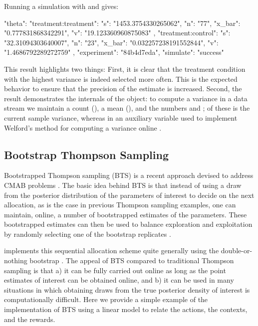 \documentclass[nojss]{jss}
\begin{document}
Running a simulation with  and  gives:

\begin{Code}
{
    "theta": {
        "treatment:treatment": {
            "s": "1453.3754330265062",
            "n": "77",
            "x_bar": "0.777831868342291",
            "v": "19.123360960875083"
        },
        "treatment:control": {
            "s": "32.31094303640007",
            "n": "23",
            "x_bar": "0.032257238191552844",
            "v": "1.4686792289272759"
        }
    },
    "experiment": "84b4d7eda",
    "simulate": "success"
}
\end{Code}
This result highlights two things: First, it is clear that the treatment condition with the highest variance is indeed selected more often. This is the expected behavior to ensure that the precision of the estimate is increased. Second, the result demonstrates the internals of the  object: to compute a variance in a data stream we maintain a count (), a mean (), and the numbers  and ; of these  is the current sample variance, whereas  in an auxiliary variable used to implement Welford's method for computing a variance online \citep{welford1962note}.


\subsection{Bootstrap Thompson Sampling}

Bootstrapped Thompson sampling (BTS) is a recent approach devised to address CMAB problems \citep[see,  e.g.,][]{Kaptein,Osband2015}. The basic idea behind BTS is that instead of using a draw from the posterior distribution of the parameters of interest to decide on the next allocation, as is the case in previous Thompson sampling examples, one can maintain, online, a number of bootstrapped estimates of the parameters. These bootstrapped estimates can then be used to balance exploration and exploitation by randomly selecting one of the bootstrap replicates \citep[see][for details]{Kaptein}.

 implements this sequential allocation scheme quite generally using the double-or-nothing bootstrap \citep{Owen2012}. The appeal of BTS compared to traditional Thompson sampling is that a) it can be fully carried out online as long as the point estimates of interest can be obtained online, and b) it can be used in many situations in which obtaining draws from the true posterior density of interest is computationally difficult. Here we provide a simple example of the implementation of BTS using a linear model to relate the actions, the contexts, and the rewards.
\end{document}
